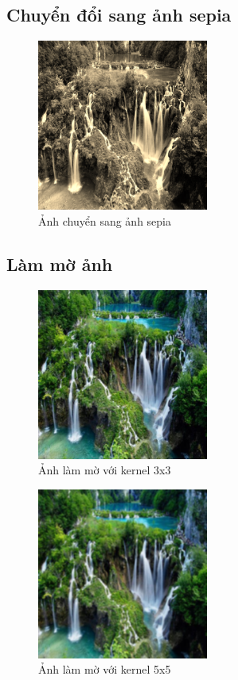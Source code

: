 \subsection{Chuyển đổi sang ảnh sepia}
\begin{figure}[H]
	\centering
	\includegraphics[width=0.5\textwidth]{images/res/512_sepia.png}
	\caption{Ảnh chuyển sang ảnh sepia}
	\label{fig:sepia}
\end{figure}

\subsection{Làm mờ ảnh}
\begin{figure}[H]
	\centering
	\includegraphics[width=0.5\textwidth]{images/res/512_blur3.png}
	\caption{Ảnh làm mờ với kernel 3x3}
	\label{fig:blur}
\end{figure}

\begin{figure}[H]
	\centering
	\includegraphics[width=0.5\textwidth]{images/res/512_blur5.png}
	\caption{Ảnh làm mờ với kernel 5x5}
	\label{fig:blur}
\end{figure}

